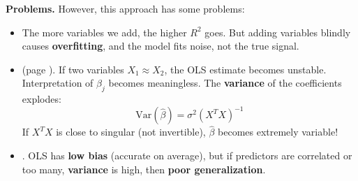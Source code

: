 \highspace
\textcolor{Red2}{ \textbf{Problems.}} However, this approach has some problems:
\begin{itemize}
    \item {} The more variables we add, the higher $R^{2}$ goes. But adding variables blindly causes \textbf{overfitting}, and the model fits noise, not the true signal.

    \item {} (page ). If two variables $X_1 \approx X_2$, the OLS estimate becomes unstable. Interpretation of $\beta_j$ becomes meaningless. The \textbf{variance} of the coefficients explodes:
    \begin{equation*}
        \text{Var}\left(\hat{\beta}\right) = \sigma^{2} \left(X^{T} X\right)^{-1}
    \end{equation*}
    If $X^TX$ is close to singular (not invertible), $\hat{\beta}$ becomes extremely variable!

    \item {}. OLS has \textbf{low bias} (accurate on average), but if predictors are correlated or too many, \textbf{variance} is high, then \textbf{poor generalization}.
\end{itemize}